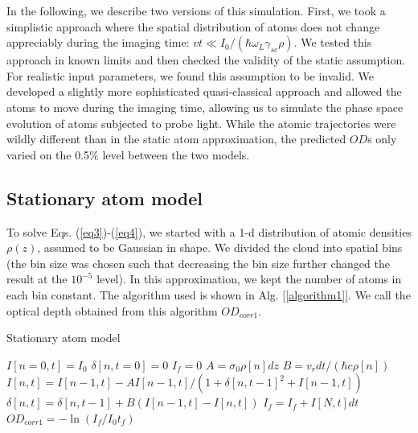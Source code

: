 \documentclass[12pt]{iopart}
\begin{document}
\par In the following, we describe two versions of this simulation. First, we took a simplistic approach where the spatial distribution of atoms does not change appreciably during the imaging time: $vt\ll I_0/(\hbar \omega_L \gamma_{sc} \rho)$. We tested this approach in known limits and then checked the validity of the static assumption. For realistic input parameters, we found this assumption to be invalid. We developed a slightly more sophisticated quasi-classical approach and allowed the atoms to move during the imaging time, allowing us to simulate the phase space evolution of atoms subjected to probe light. While the atomic trajectories were wildly different than in the static atom approximation, the predicted $OD$s only varied on the 0.5$\%$ level between the two models. 


\subsection{Stationary atom model}
To solve Eqs. (\ref{eq3})-(\ref{eq4}), we started with a 1-d distribution of atomic densities $\rho(z)$, assumed to be Gaussian in shape. We divided the cloud into spatial bins (the bin size was chosen such that decreasing the bin size further changed the result at the $10^{-5}$ level).  In this approximation, we kept the number of atoms in each bin constant.  The algorithm used is shown in Alg. [\ref{algorithm1}]. We call the optical depth obtained from this algorithm $OD_{corr1}$.

\begin{algorithm}
\caption{Stationary atom model}
\label{algorithm1}
\begin{algorithmic}
\STATE $I[n=0,t]=I_0$  
\STATE $\delta[n, t=0]=0$ 
\STATE $I_f=0$ 
 \STATE $A=\sigma_0\rho[n] dz$ 
 \STATE $B=v_r dt/(\hbar c \rho[n])$  
\STATE $I[n,t]=I[n-1,t] - A I[n-1,t]/(1+\delta[n,t-1]^2+I[n-1,t])$  
\STATE $\delta[n,t]=\delta[n,t-1]+B\left(I[n-1,t]-I[n,t]\right)$   
\ENDFOR 
\STATE $I_f =I_f+ I[N,t]dt$
\ENDFOR
\STATE $OD_{corr1}=-\ln{(I_f/I_0t_f)}$
\end{algorithmic}
\end{algorithm}
\end{document}
